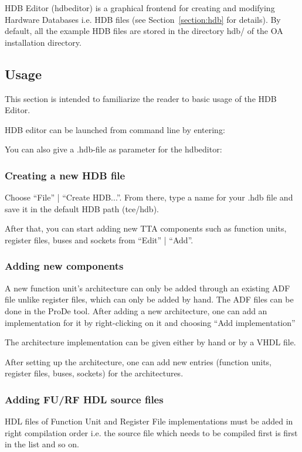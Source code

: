 \documentclass[a4paper,twoside]{tceusermanual}
\begin{document}
HDB Editor (hdbeditor) is a graphical frontend for creating and
modifying Hardware Databases i.e. HDB files (see Section~\ref{section:hdb}
for details). By default, all the example HDB files are stored in the directory
hdb/ of the OA installation directory.

\subsection{Usage}

This section is intended to familiarize the reader to basic usage of the HDB
Editor.

HDB editor can be launched from command line by entering:


You can also give a .hdb-file as parameter for the hdbeditor:


\subsubsection{Creating a new HDB file}

Choose ``File'' | ``Create HDB...''. 
From there, type a name for your .hdb file and save it in the default HDB path
(tce/hdb).

After that, you can start adding new TTA components such as function units,
register files, buses and sockets from ``Edit'' | ``Add''.

\subsubsection{Adding new components}
A new function unit's architecture can only be added through an existing ADF
file unlike register files, which can only be added by hand. The ADF files
can be done in the ProDe tool. After adding a new architecture, one can add an
implementation for it by right-clicking on it and choosing ``Add
implementation''

The architecture implementation can be given either by hand or by a VHDL file.

After setting up the architecture, one can add new entries (function units,
register files, buses, sockets) for the architectures.

\subsubsection{Adding FU/RF HDL source files}
HDL files of Function Unit and Register File implementations must be added in
right compilation order i.e. the source file which needs to be compiled first
is first in the list and so on.
\end{document}
